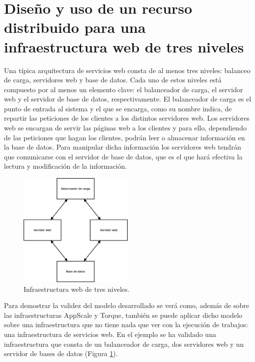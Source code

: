 \section{Diseño y uso de un recurso distribuido para una infraestructura web de tres niveles}

Una típica arquitectura de servicios web consta de al menos tres niveles: balanceo de carga, servidores web y base de datos. Cada uno de estos niveles está compuesto por al menos un elemento clave: el balanceador de carga, el servidor web y el servidor de base de datos, respectivamente. El balanceador de carga es el punto de entrada al sistema y el que se encarga, como su nombre indica, de repartir las peticiones de los clientes a los distintos servidores web. Los servidores web se encargan de servir las páginas web a los clientes y para ello, dependiendo de las peticiones que hagan los clientes, podrán leer o almacenar información en la base de datos. Para manipular dicha información los servidores web tendrán que comunicarse con el servidor de base de datos, que es el que hará efectiva la lectura y modificación de la información.\\

\begin{figure} [!htbp]
  \centering
  \includegraphics[width=0.5\textwidth]{figuras/Arquitectura_Web2.eps}
  \caption{Infraestructura web de tres niveles.}
\label{figure:arquitectura-web}
\end{figure}

Para demostrar la validez del modelo desarrollado se verá como, además de sobre las infraestructuras AppScale y Torque, también se puede aplicar dicho modelo sobre una infraestructura que no tiene nada que ver con la ejecución de trabajos: una infraestructura de servicios web. En el ejemplo se ha validado una infraestructura que consta de un balanceador de carga, dos servidores web y un servidor de bases de datos (Figura \ref{figure:arquitectura-web}).

